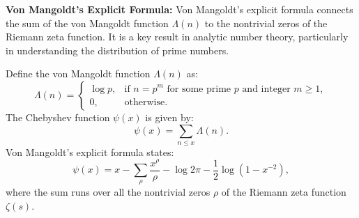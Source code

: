 \textbf{Von Mangoldt's Explicit Formula:} Von Mangoldt’s explicit formula connects the sum of the von Mangoldt function $\Lambda(n)$ to the nontrivial zeros of the Riemann zeta function. It is a key result in analytic number theory, particularly in understanding the distribution of prime numbers.

Define the von Mangoldt function \( \Lambda(n) \) as:
\[
\Lambda(n) =
\begin{cases}
\log p, & \text{if } n = p^m \text{ for some prime } p \text{ and integer } m \geq 1, \\
0, & \text{otherwise}.
\end{cases}
\]
The Chebyshev function \( \psi(x) \) is given by:
\[
\psi(x) = \sum_{n \leq x} \Lambda(n).
\]
Von Mangoldt's explicit formula states:
\[
\psi(x) = x - \sum_{\rho} \frac{x^{\rho}}{\rho} - \log 2\pi - \frac{1}{2} \log(1 - x^{-2}),
\]
where the sum runs over all the nontrivial zeros \( \rho \) of the Riemann zeta function \( \zeta(s) \).